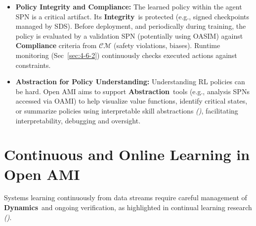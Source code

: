 \documentclass[12pt,a4paper]{report}
\renewcommand{\citep}[1]{\textit{\scriptsize{(\cite{#1})}}}
\newcommand{\Integrity}{\textbf{Integrity}}
\newcommand{\Abstraction}{\textbf{Abstraction}}
\newcommand{\Dynamics}{\textbf{Dynamics}}
\begin{document}
\begin{itemize}
		\item \textbf{Policy Integrity and Compliance:} The learned policy within the agent SPN is a critical artifact. Its \Integrity\ is protected (e.g., signed checkpoints managed by SDS). Before deployment, and periodically during training, the policy is evaluated by a validation SPN (potentially using OASIM) against \textbf{Compliance} criteria from $\mathcal{CM}$ (safety violations, biases). Runtime monitoring (Sec~\ref{sec:4-6-2}) continuously checks executed actions against constraints.
		\item \textbf{Abstraction for Policy Understanding:} Understanding RL policies can be hard. Open AMI aims to support \Abstraction\ tools (e.g., analysis SPNs accessed via OAMI) to help visualize value functions, identify critical states, or summarize policies using interpretable skill abstractions \citep{LISA_Interpretable_Skills_2021}, facilitating interpretability, debugging and oversight.
	\end{itemize}
	
	\section{Continuous and Online Learning in Open AMI} %
	\label{sec:3-6} %
	
	Systems learning continuously from data streams require careful management of \Dynamics\ and ongoing verification, as highlighted in continual learning research \citep{Wang2024ContinualLearningSurvey}.
	
\end{document}
